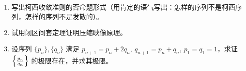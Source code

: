 \begin{exercise}{}
\begin{enumerate}
\item 写出柯西收敛准则的否命题形式（用肯定的语气写出：怎样的序列不是柯西序列，怎样的序列不是发散的）。
\item 试用闭区间套定理证明压缩映像原理。
\item 设序列 $\{p_n\}, \{q_n\}$ 满足 $p_{n+1}=p_n+2q_n,\ q_{n+1}=p_n+q_n,\ p_1=q_1=1$，求证 $\left\{\large\frac{p_n}{q_n}\right\}$ 的极限存在，并求其极限。
\end{enumerate}
\end{exercise}